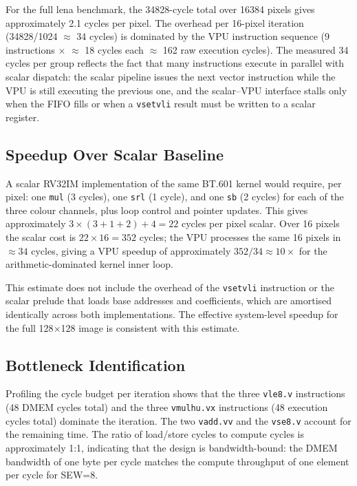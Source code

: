 For the full lena benchmark, the 34828-cycle total over 16384 pixels gives approximately
2.1 cycles per pixel. The overhead per 16-pixel iteration (34828/1024 $\approx$ 34
cycles) is dominated by the VPU instruction sequence (9 instructions $\times$ $\approx$
18 cycles each $\approx$ 162 raw execution cycles). The measured 34 cycles per group
reflects the fact that many instructions execute in parallel with scalar dispatch: the
scalar pipeline issues the next vector instruction while the VPU is still executing the
previous one, and the scalar--VPU interface stalls only when the FIFO fills or when a
\texttt{vsetvli} result must be written to a scalar register.

\subsection{Speedup Over Scalar Baseline}

A scalar RV32IM implementation of the same BT.601 kernel would require, per pixel:
one \texttt{mul} (3 cycles), one \texttt{srl} (1 cycle), and one \texttt{sb} (2 cycles)
for each of the three colour channels, plus loop control and pointer updates. This
gives approximately $3 \times (3+1+2) + 4 = 22$ cycles per pixel scalar. Over 16
pixels the scalar cost is $22 \times 16 = 352$ cycles; the VPU processes the same 16
pixels in $\approx 34$ cycles, giving a VPU speedup of approximately $352/34 \approx
10\times$ for the arithmetic-dominated kernel inner loop.

This estimate does not include the overhead of the \texttt{vsetvli} instruction or the
scalar prelude that loads base addresses and coefficients, which are amortised identically
across both implementations. The effective system-level speedup for the full 128$\times$128
image is consistent with this estimate.

\subsection{Bottleneck Identification}

Profiling the cycle budget per iteration shows that the three \texttt{vle8.v} instructions
(48 DMEM cycles total) and the three \texttt{vmulhu.vx} instructions (48 execution cycles
total) dominate the iteration. The two \texttt{vadd.vv} and the \texttt{vse8.v} account
for the remaining time. The ratio of load/store cycles to compute cycles is approximately
1:1, indicating that the design is bandwidth-bound: the DMEM bandwidth of one byte per
cycle matches the compute throughput of one element per cycle for SEW=8.

